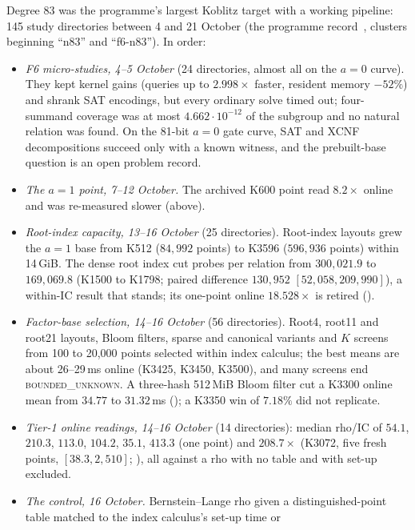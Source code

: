 Degree 83 was the programme's largest Koblitz target with a working
pipeline: 145 study directories between 4 and 21 October
(the programme record~\cite{icprogram2026}, clusters beginning ``n83'' and ``f6-n83'').
In order:
\begin{itemize}
\item \emph{F6 micro-studies, 4--5 October} (24 directories, almost all on
  the $a=0$ curve). They kept kernel gains (queries up to $2.998\times$
  faster, resident memory $-52\%$) and shrank SAT encodings, but every
  ordinary solve timed out; four-summand coverage was at most
  $4.662\cdot10^{-12}$ of the subgroup and no natural relation was found.
  On the 81-bit $a=0$ gate curve, SAT and XCNF decompositions succeed only
  with a known witness, and the prebuilt-base question is an open problem
  record.
\item \emph{The $a=1$ point, 7--12 October.} The archived K600 point read
  $8.2\times$ online and was re-measured slower (above).
\item \emph{Root-index capacity, 13--16 October} (25 directories). Root-index
  layouts grew the $a=1$ base from K512 ($84{,}992$ points) to K3596
  ($596{,}936$ points) within 14\,GiB. The dense root index cut probes per
  relation from $300{,}021.9$ to $169{,}069.8$ (K1500 to K1798; paired
  difference $130{,}952$ $[52{,}058,209{,}990]$), a within-IC result that
  stands; its one-point online $18.528\times$ is retired
  ().
\item \emph{Factor-base selection, 14--16 October} (56 directories). Root4,
  root11 and root21 layouts, Bloom filters, sparse and canonical variants
  and $K$ screens from 100 to 20{,}000 points selected within index calculus;
  the best means are about 26--29\,ms online (K3425, K3450, K3500), and
  many screens end \textsc{bounded\_unknown}. A three-hash 512\,MiB Bloom
  filter cut a K3300 online mean from $34.77$ to $31.32$\,ms
  (); a K3350 win of
  $7.18\%$ did not replicate.
\item \emph{Tier-1 online readings, 14--16 October} (14 directories): median
  rho/IC of $54.1$, $210.3$, $113.0$, $104.2$, $35.1$, $413.3$ (one point)
  and $208.7\times$ (K3072, five fresh points, $[38.3,2{,}510]$;
  ), all against a rho with no
  table and with set-up excluded.
\item \emph{The control, 16 October.} Bernstein--Lange rho given a
  distinguished-point table matched to the index calculus's set-up time or

\end{itemize}
